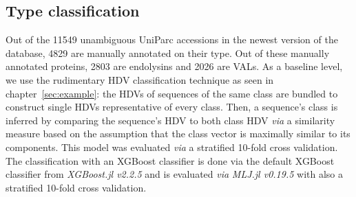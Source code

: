 \subsection*{Type classification}
Out of the 11549 unambiguous UniParc accessions in the newest version of the database, 4829 are manually annotated on their type. Out of these manually annotated proteins, 2803 are endolysins and 2026 are VALs. As a baseline level, we use the rudimentary HDV classification technique as seen in chapter~\ref{sec:example}: the HDVs of sequences of the same class are bundled to construct single HDVs representative of every class. Then, a sequence's class is inferred by comparing the sequence's HDV to both class HDV \textit{via} a similarity measure based on the assumption that the class vector is maximally similar to its components. This model was evaluated \textit{via} a stratified 10-fold cross validation. The classification with an XGBoost classifier is done via the default XGBoost classifier from \textit{XGBoost.jl v2.2.5} and is evaluated \textit{via} \textit{MLJ.jl v0.19.5} with also a stratified 10-fold cross validation.